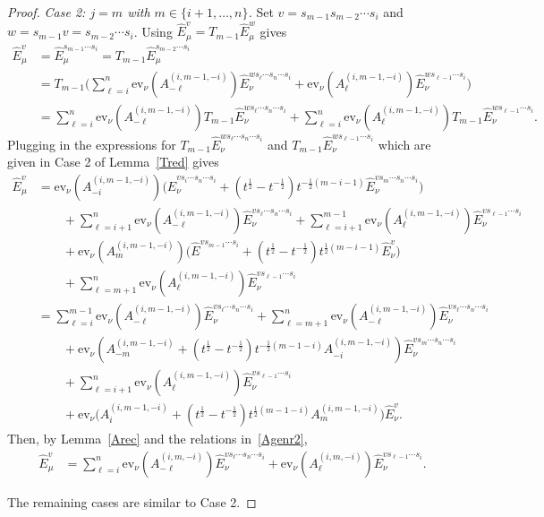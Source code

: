 \documentclass[11pt]{article}
\theoremstyle{plain}
\theoremstyle{definition}
\theoremstyle{remark}
\numberwithin{equation}{section}
\def\ev{\mathrm{ev}}
\newcounter{r}
\newcounter{s}
\begin{document}
\begin{proof}
\noindent
\emph{Case 2:  $j=m$ with $m\in \{i+1, \ldots, n\}$.} 
Set $v = s_{m-1}s_{m-2}\cdots s_i$ and $w= s_{m-1}v = s_{m-2}\cdots s_i$.  
Using $\widehat{E}^v_\mu = T_{m-1} \widehat{E}^w_\mu$ gives
\begin{align*}
\widehat{E}^v_\mu &= \widehat{E}^{s_{m-1}\cdots s_i}_\mu
= T_{m-1}\widehat{E}^{s_{m-2}\cdots s_i}_\mu
\\
&= T_{m-1}\Big(\sum_{\ell = i}^n 
\ev_\nu(A^{(i,m-1,-i)}_{-\ell}) \widehat{E}^{ws_\ell \cdots s_n\cdots s_i}_\nu
+\ev_\nu(A^{(i,m-1,-i)}_{\ell}) \widehat{E}^{ws_{\ell-1} \cdots s_i}_\nu\Big)
\\
&= \sum_{\ell = i}^n 
\ev_\nu(A^{(i,m-1,-i)}_{-\ell}) T_{m-1}\widehat{E}^{ws_\ell \cdots s_n\cdots s_i}_\nu
+\sum_{\ell = i}^n \ev_\nu(A^{(i,m-1,-i)}_{\ell}) T_{m-1}\widehat{E}^{ws_{\ell-1} \cdots s_i}_\nu.
\end{align*}
Plugging in the expressions for $T_{m-1}\widehat{E}^{ws_\ell \cdots s_n\cdots s_i}_\nu$ and $T_{m-1}\widehat{E}^{ws_{\ell-1} \cdots s_i}_\nu$
which are given in Case 2 of Lemma~\ref{Tred} gives
\begin{align*}
\widehat{E}^v_\mu 
&= 
\ev_\nu(A^{(i,m-1,-i)}_{-i}) \big(
\widehat{E}^{vs_i\cdots s_n\cdots s_i}_\nu
+(t^{\frac12}-t^{-\frac12})t^{-\frac12(m-i-1)} \widehat{E}_\nu^{vs_m\cdots s_n \cdots s_i}\big) \\
&\qquad+
\sum_{\ell=i+1}^{n} 
\ev_\nu(A^{(i,m-1,-i)}_{-\ell})  \widehat{E}^{vs_\ell \cdots s_n\cdots s_i}_\nu
+
\sum_{\ell=i+1}^{m-1} \ev_\nu(A^{(i,m-1,-i)}_{\ell})  \widehat{E}^{vs_{\ell-1} \cdots  s_i}_\nu \\
&\qquad+ \ev_\nu(A^{(i,m-1,-i)}_{m})
\big(\widehat{E}^{vs_{m-1} \cdots  s_i}+(t^{\frac12}-t^{-\frac12})t^{\frac12(m-i-1)}\widehat{E}^v_\nu\big) \\
&\qquad+
\sum_{\ell=m+1}^{n} \ev_\nu(A^{(i,m-1,-i)}_{\ell})  \widehat{E}^{vs_{\ell-1} \cdots  s_i}_\nu \\
&= \sum_{\ell=i}^{m-1} \ev_\nu(A_{-\ell}^{(i,m-1,-i)}) \widehat{E}^{vs_\ell \cdots s_n\cdots s_i}_\nu 
+ \sum_{\ell=m+1}^{n} \ev_\nu(A_{-\ell}^{(i,m-1,-i)}) \widehat{E}^{vs_\ell \cdots s_n\cdots s_i}_\nu \\
&\qquad+ \ev_\nu(A_{-m}^{(i,m-1,-i)} + (t^{\frac12}-t^{-\frac12})t^{-\frac12(m-1-i)}A_{-i}^{(i,m-1,-i)}) 
\widehat{E}^{vs_m \cdots s_n\cdots s_i}_\nu \\
&\qquad+ \sum_{\ell=i+1}^{n} \ev_\nu(A_{\ell}^{(i,m-1,-i)}) \widehat{E}^{vs_{\ell-1} \cdots  s_i}_\nu \\
&\qquad+ \ev_\nu\big(A_{i}^{(i,m-1,-i)} + (t^{\frac12}-t^{-\frac12})t^{\frac12(m-1-i)}A_m^{(i,m-1,-i)}\big) \widehat{E}^v_\nu.
\end{align*}
Then, by Lemma~\ref{Arec} and the relations in~\eqref{Agenr2},
\begin{align*}
\widehat{E}^v_\mu 
&=\sum_{\ell = i}^n \ev_\nu(A^{(i,m,-i)}_{-\ell}) \widehat{E}^{vs_\ell \cdots s_n\cdots s_i}_\nu
+\ev_\nu(A^{(i,m,-i)}_{\ell}) \widehat{E}^{vs_{\ell-1} \cdots s_i}_\nu.
\end{align*}

The remaining cases are similar to Case 2. 

\end{proof}
\end{document}
